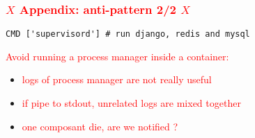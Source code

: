 \documentclass{beamer}
\begin{document}
\begin{frame}[fragile]
    \frametitle{\textcolor{red}{$X$ Appendix: anti-pattern 2/2 $X$}}

    \begin{verbatim}
CMD ['supervisord'] # run django, redis and mysql
    \end{verbatim}

    \vfill

    \textcolor{red}{Avoid running a process manager inside a container:}
    \begin{itemize}
        \item \textcolor{red}{logs of process manager are not really useful}
        \item \textcolor{red}{if pipe to stdout, unrelated logs are mixed together}
        \item \textcolor{red}{one composant die, are we notified ?}
    \end{itemize}
\end{frame}
\end{document}

